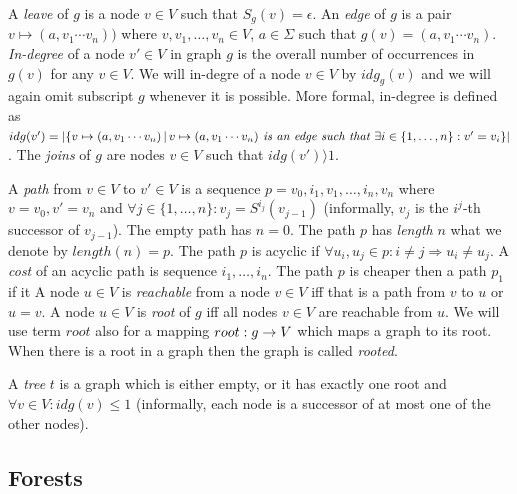 A \emph{leave} of $g$ is a node $v \in V$ such that $S_g(v) = \epsilon$.
An \emph{edge} of $g$ is a pair $v \mapsto (a, v_1 \cdots v_n))$ where $v, v_1, \ldots, v_n \in V$,
$a \in \Sigma$ such that $g(v) = (a, v_1 \cdots v_n)$.
\emph{In-degree} of a node $v' \in V$ in graph $g$ is the overall number of occurrences in $g(v)$ for any $v \in V$.
We will in-degre of a node $v \in V$ by $idg_g(v)$ and we will again omit subscript $g$ whenever it is possible.
More formal, in-degree is defined as $idg(v') = |\{v \mapsto (a, v_1 \cdots v_n) \,|\, v \mapsto (a, v_1 \cdots v_n) \emph{ is an edge such that } \exists i \in \{1,\ldots,n\}: v' = v_i\}|$.
The \emph{joins} of $g$ are nodes $v \in V$ such that $idg(v') \rangle 1$.

A \emph{path} from $v\in V$ to $v' \in V$ is a sequence $p=v_0, i_1, v_1, \ldots, i_n, v_n$ where $v=v_0, v' = v_n$
and $\forall j \in \{1,\ldots,n\}: v_j = S^{i_j}(v_{j-1})$ (informally, $v_j$ is the $i^j$-th successor of $v_{j-1}$).
The empty path has $n=0$.
The path $p$ has \emph{length} $n$ what we denote by $length(n) = p$.
The path $p$ is acyclic if $\forall u_i,u_j \in p: i \neq j \Rightarrow u_i \neq u_j$.
A \emph{cost} of an acyclic path is sequence $i_1, \ldots, i_n$.
The path $p$ is cheaper then a path $p_1$ if it 
A node $u \in V$ is \emph{reachable} from a node $v \in V$ iff that is a path from $v$ to $u$ or $u=v$.
A node $u \in V$ is \emph{root} of $g$ iff all nodes $v \in V$ are reachable from $u$.
We will use term $root$ also for a mapping $root: g \rightarrow V$ which maps a graph to its root.
When there is a root in a graph then the graph is called \emph{rooted}.

A \emph{tree} $t$ is a graph which is either empty, or it has exactly one root and $\forall v \in V: idg(v) \leq 1$ (informally,
each node is a successor of at most one of the other nodes).

\subsection{Forests}
\label{subsec:forests}

